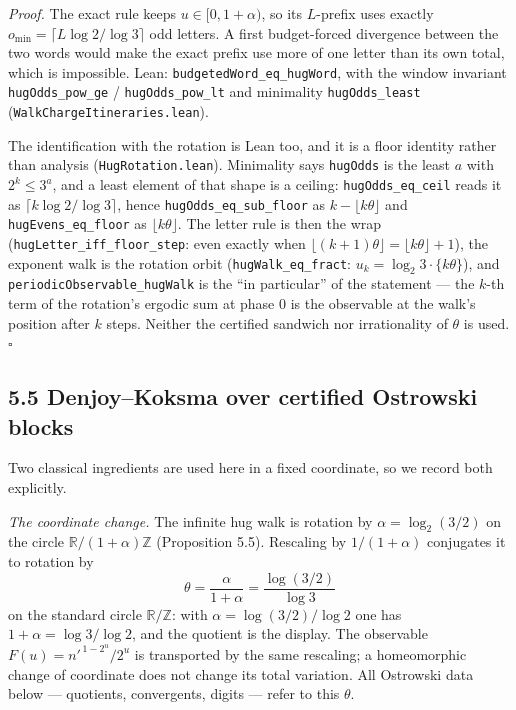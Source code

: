 \documentclass[12pt]{article}
\begin{document}
\emph{Proof.} The exact rule keeps \(u\in[0,1+\alpha)\), so its
\(L\)-prefix uses exactly \(o_{\min}=\lceil L\log 2/\log 3\rceil\) odd
letters. A first budget-forced divergence between the two words would
make the exact prefix use more of one letter than its own total, which
is impossible. Lean: \texttt{\nolinkurl{budgetedWord_eq_hugWord}}, with
the window invariant \texttt{\nolinkurl{hugOdds_pow_ge}} /
\texttt{\nolinkurl{hugOdds_pow_lt}} and minimality
\texttt{\nolinkurl{hugOdds_least}}
(\texttt{\nolinkurl{WalkChargeItineraries.lean}}).

The identification with the rotation is Lean too, and it is a floor
identity rather than analysis (\texttt{\nolinkurl{HugRotation.lean}}).
Minimality says \texttt{\nolinkurl{hugOdds}} is the least \(a\) with
\(2^k\le3^a\), and a least element of that shape is a ceiling:
\texttt{\nolinkurl{hugOdds_eq_ceil}} reads it as
\(\lceil k\log2/\log3\rceil\), hence
\texttt{\nolinkurl{hugOdds_eq_sub_floor}} as
\(k-\lfloor k\theta\rfloor\) and \texttt{\nolinkurl{hugEvens_eq_floor}}
as \(\lfloor k\theta\rfloor\). The letter rule is then the wrap
(\texttt{\nolinkurl{hugLetter_iff_floor_step}}: even exactly when
\(\lfloor(k+1)\theta\rfloor=\lfloor k\theta\rfloor+1\)), the exponent
walk is the rotation orbit (\texttt{\nolinkurl{hugWalk_eq_fract}}:
\(u_k=\log_2 3\cdot\{k\theta\}\)), and
\texttt{\nolinkurl{periodicObservable_hugWalk}} is the ``in particular''
of the statement --- the \(k\)-th term of the rotation's ergodic sum at
phase \(0\) is the observable at the walk's position after \(k\) steps.
Neither the certified sandwich nor irrationality of \(\theta\) is used.
\(\square\)

\subsection{5.5 Denjoy--Koksma over certified Ostrowski
blocks}\label{denjoykoksma-over-certified-ostrowski-blocks}

Two classical ingredients are used here in a fixed coordinate, so we
record both explicitly.

\emph{The coordinate change.} The infinite hug walk is rotation by
\(\alpha=\log_2(3/2)\) on the circle \(\mathbb R/(1+\alpha)\mathbb Z\)
(Proposition 5.5). Rescaling by \(1/(1+\alpha)\) conjugates it to
rotation by \[
\theta=\frac{\alpha}{1+\alpha}
=\frac{\log(3/2)}{\log 3}
\] on the standard circle \(\mathbb R/\mathbb Z\): with
\(\alpha=\log(3/2)/\log 2\) one has \(1+\alpha=\log 3/\log 2\), and the
quotient is the display. The observable \(F(u)=n'^{\,1-2^u}/2^u\) is
transported by the same rescaling; a homeomorphic change of coordinate
does not change its total variation. All Ostrowski data below ---
quotients, convergents, digits --- refer to this \(\theta\).
\end{document}
